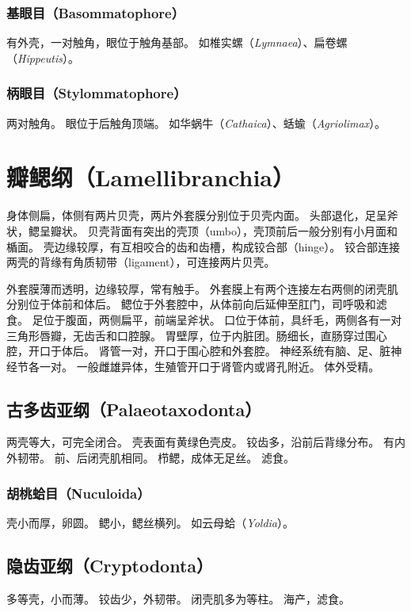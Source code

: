 \documentclass[11pt]{article}
\begin{document}
\subsubsection{基眼目（Basommatophore）}
有外壳，一对触角，眼位于触角基部。
如椎实螺（\textit{Lymnaea}）、扁卷螺（\textit{Hippeutis}）。

\subsubsection{柄眼目（Stylommatophore）}
两对触角。
眼位于后触角顶端。
如华蜗牛（\textit{Cathaica}）、蛞蝓（\textit{Agriolimax}）。

\section{瓣鳃纲（Lamellibranchia）}
身体侧扁，体侧有两片贝壳，两片外套膜分别位于贝壳内面。
头部退化，足呈斧状，鳃呈瓣状。
贝壳背面有突出的壳顶（umbo），壳顶前后一般分别有小月面和楯面。
壳边缘较厚，有互相咬合的齿和齿槽，构成铰合部（hinge）。
铰合部连接两壳的背缘有角质韧带（ligament），可连接两片贝壳。

\newline

外套膜薄而透明，边缘较厚，常有触手。
外套膜上有两个连接左右两侧的闭壳肌分别位于体前和体后。
鳃位于外套腔中，从体前向后延伸至肛门，司呼吸和滤食。
足位于腹面，两侧扁平，前端呈斧状。
口位于体前，具纤毛，两侧各有一对三角形唇瓣，无齿舌和口腔腺。
胃壁厚，位于内脏团。肠细长，直肠穿过围心腔，开口于体后。
肾管一对，开口于围心腔和外套腔。
神经系统有脑、足、脏神经节各一对。
一般雌雄异体，生殖管开口于肾管内或肾孔附近。
体外受精。

\subsection{古多齿亚纲（Palaeotaxodonta）}
两壳等大，可完全闭合。
壳表面有黄绿色壳皮。
铰齿多，沿前后背缘分布。
有内外韧带。
前、后闭壳肌相同。
栉鳃，成体无足丝。
滤食。

\subsubsection{胡桃蛤目（Nuculoida）}
壳小而厚，卵圆。
鳃小，鳃丝横列。
如云母蛤（\textit{Yoldia}）。

\subsection{隐齿亚纲（Cryptodonta）}
多等壳，小而薄。
铰齿少，外韧带。
闭壳肌多为等柱。
海产，滤食。
\end{document}

